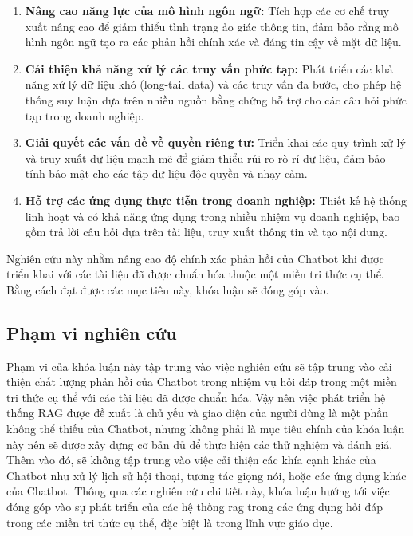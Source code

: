 \begin{enumerate}
    \item \textbf{Nâng cao năng lực của mô hình ngôn ngữ:} Tích hợp các cơ chế truy xuất nâng cao để giảm thiểu tình trạng ảo giác thông tin, đảm bảo rằng mô hình ngôn ngữ tạo ra các phản hồi chính xác và đáng tin cậy về mặt dữ liệu.


    \item \textbf{Cải thiện khả năng xử lý các truy vấn phức tạp:} Phát triển các khả năng xử lý dữ liệu khó (long-tail data) và các truy vấn đa bước, cho phép hệ thống suy luận dựa trên nhiều nguồn bằng chứng hỗ trợ cho các câu hỏi phức tạp trong doanh nghiệp.
    \item \textbf{Giải quyết các vấn đề về quyền riêng tư:} Triển khai các quy trình xử lý và truy xuất dữ liệu mạnh mẽ để giảm thiểu rủi ro rò rỉ dữ liệu, đảm bảo tính bảo mật cho các tập dữ liệu độc quyền và nhạy cảm.
    \item \textbf{Hỗ trợ các ứng dụng thực tiễn trong doanh nghiệp:} Thiết kế hệ thống linh hoạt và có khả năng ứng dụng trong nhiều nhiệm vụ doanh nghiệp, bao gồm trả lời câu hỏi dựa trên tài liệu, truy xuất thông tin và tạo nội dung.
\end{enumerate}


Nghiên cứu này nhằm nâng cao độ chính xác phản hồi của Chatbot khi được triển khai với các tài liệu đã được chuẩn hóa thuộc một miền tri thức cụ thể. Bằng cách đạt được các mục tiêu này, khóa luận sẽ đóng góp vào.
\subsection{Phạm vi nghiên cứu}
\label{subsection:scope}
Phạm vi của khóa luận này tập trung vào việc nghiên cứu sẽ tập trung vào cải thiện chất lượng phản hồi của Chatbot trong nhiệm vụ hỏi đáp trong một miền tri thức cụ thể với các tài liệu đã được chuẩn hóa. Vậy nên việc phát triển hệ thống RAG được đề xuất là chủ yếu và giao diện của người dùng là một phần không thể thiếu của Chatbot, nhưng không phải là mục tiêu chính của khóa luận này nên sẽ được xây dựng cơ bản đủ để thực hiện các thử nghiệm và đánh giá. Thêm vào đó, sẽ không tập trung vào việc cải thiện các khía cạnh khác của Chatbot như xử lý lịch sử hội thoại, tương tác giọng nói, hoặc các ứng dụng khác của Chatbot. Thông qua các nghiên cứu chi tiết này, khóa luận hướng tới việc đóng góp vào sự phát triển của các hệ thống \gls{rag} trong các ứng dụng hỏi đáp trong các miền tri thức cụ thể, đặc biệt là trong lĩnh vực giáo dục.


